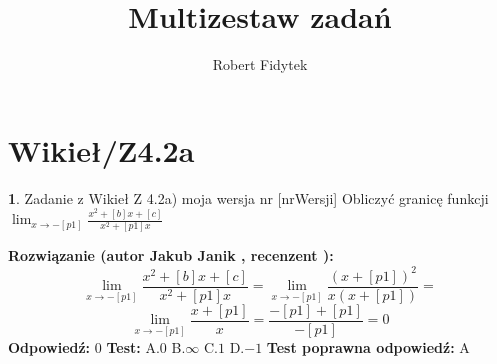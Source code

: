 \documentclass[12pt, a4paper]{article}
\title{Multizestaw zadań}
\author{Robert Fidytek}
\date{}
\theoremstyle{definition} %
\newtheorem{zad}{}
\newcommand{\kategoria}[1]{\section{#1}} %
\newcommand{\zadStart}[1]{\begin{zad}#1\newline} %
\newcommand{\zadStop}{\end{zad}}   %
\newcommand{\rozwStart}[2]{\noindent \textbf{Rozwiązanie (autor #1 , recenzent #2): }\newline} %
\newcommand{\rozwStop}{\newline}                                            %
\newcommand{\odpStart}{\noindent \textbf{Odpowiedź:}\newline}    %
\newcommand{\odpStop}{\newline}                                             %
\newcommand{\testStart}{\noindent \textbf{Test:}\newline} %
\newcommand{\testStop}{\newline} %
\newcommand{\kluczStart}{\noindent \textbf{Test poprawna odpowiedź:}\newline} %
\newcommand{\kluczStop}{\newline} %
\begin{document}
\maketitle


\kategoria{Wikieł/Z4.2a}
\zadStart{Zadanie z Wikieł Z 4.2a) moja wersja nr [nrWersji]}
Obliczyć granicę funkcji $\lim_{x \to -[p1]} \frac{x^2 + [b]x + [c]}{x^2 + [p1]x}$
\zadStop
\rozwStart{Jakub Janik}{}
$$\lim_{x \to -[p1]} \frac{x^2 + [b]x + [c]}{x^2 + [p1]x} = \lim_{x \to -[p1]} \frac{(x+[p1])^2}{x(x+[p1])}=$$
$$\lim_{x \to -[p1]} \frac{x+[p1]}{x}=\frac{-[p1]+[p1]}{-[p1]}=0$$
\rozwStop
\odpStart
$0$
\odpStop
\testStart
A.$0$
B.$\infty$
C.$1$
D.$-1$
\testStop
\kluczStart
A
\kluczStop
\end{document}
